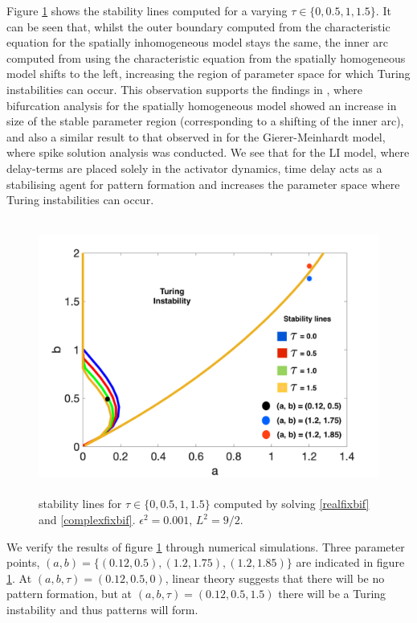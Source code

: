 Figure \ref{fig:tspacetau} shows the stability lines computed for a varying $\tau\in\{0,0.5,1,1.5\}$. It can be seen that, whilst the outer boundary computed from the characteristic equation for the spatially inhomogeneous model stays the same, the inner arc computed from using the characteristic equation from the spatially homogeneous model shifts to the left, increasing the region of parameter space for which Turing instabilities can occur. This observation supports the findings in \cite{william}, where bifurcation analysis for the spatially homogeneous model showed an increase in size of the stable parameter region (corresponding to a shifting of the inner arc), and also a similar result to that observed in \cite{fadai2} for the Gierer-Meinhardt model, where spike solution analysis was conducted. We see that for the LI model, where delay-terms are placed solely in the activator dynamics, time delay acts as a stabilising agent for pattern formation and increases the parameter space where Turing instabilities can occur.
\begin{figure}[H]
        \centering
        \includegraphics[width=12cm,height = 9cm]{tspacetau.png}
        \caption{stability lines for $\tau\in\{0,0.5,1,1.5\}$ computed by solving \eqref{realfixbif} and \eqref{complexfixbif}. $\epsilon^2=0.001$, $L^2=9/2$.}
        \label{fig:tspacetau}
\end{figure}
We verify the results of figure \ref{fig:tspacetau} through numerical simulations. Three parameter points, $(a,b)=\{(0.12,0.5),(1.2,1.75),(1.2,1.85)\}$ are indicated in figure \ref{fig:tspacetau}. At $(a,b,\tau)=(0.12,0.5,0)$, linear theory suggests that there will be no pattern formation, but at $(a,b,\tau)=(0.12,0.5,1.5)$ there will be a Turing instability and thus patterns will form.
